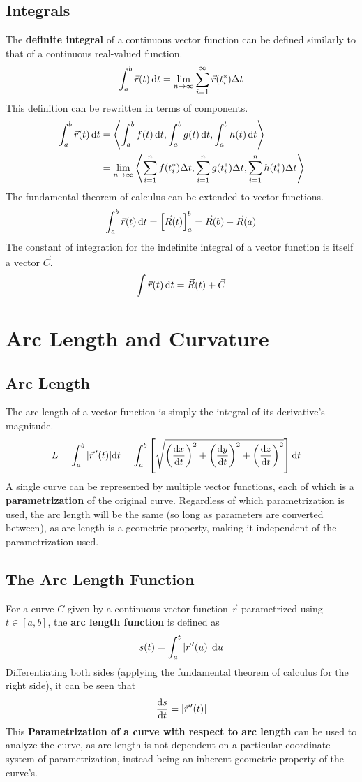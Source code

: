 \documentclass[../Calculus_\Roman{3}]{subfiles}
\begin{document}
			\subsection*{Integrals}
				The \textbf{definite integral} of a continuous vector function can be defined similarly to that of a continuous real-valued function.
					\[\int_a^b\vec{r}(t)\,\mathrm{d} t = \lim_{n\to\infty}\sum_{i = 1}^\infty \vec{r}(t_i^*)\Delta t\]
				This definition can be rewritten in terms of components.
					\begin{align*}
						\int_a^b\vec{r}(t)\,\mathrm{d} t &= \left\langle \int_a^b f(t)\,\mathrm{d} t, \int_a^b g(t)\,\mathrm{d} t, \int_a^b h(t)\,\mathrm{d} t \right\rangle \\ 
							&= \lim_{n\to\infty}\left\langle \sum_{i = 1}^n f(t_i^*)\Delta t, \sum_{i = 1}^n g(t_i^*)\Delta t, \sum_{i = 1}^n h(t_i^*)\Delta t \right\rangle
					\end{align*}
				The fundamental theorem of calculus can be extended to vector functions.
					\[\int_a^b \vec{r}(t)\,\mathrm{d} t = \left[\vec{R}(t)\right]_a^b = \vec{R}(b) - \vec{R}(a)\]
				The constant of integration for the indefinite integral of a vector function is itself a vector $\vec{C}$.
					\[\int \vec{r}(t)\,\mathrm{d} t = \vec{R}(t) + \vec{C}\]
		\section{Arc Length and Curvature}
			\subsection*{Arc Length}
				The arc length of a vector function is simply the integral of its derivative's magnitude.
					\begin{align*}
						L &= \int_a^b|\vec{r}\hspace{0.5mm}'(t)|\mathrm{d} t
								= \int_a^b\left[\sqrt{\left(\frac{\mathrm{d} x}{\mathrm{d} t}\right)^2 + \left(\frac{\mathrm{d} y}{\mathrm{d} t}\right)^2 + \left(\frac{\mathrm{d} z}{\mathrm{d} t}\right)^2}\right]\mathrm{d} t
					\end{align*}
				A single curve can be represented by multiple vector functions, each of which is a \textbf{parametrization} of the original curve. Regardless of which parametrization is used, the arc length will be the same (so long as parameters are converted between), as arc length is a geometric property, making it independent of the parametrization used.
			\subsection*{The Arc Length Function}
				For a curve $C$ given by a continuous vector function $\vec{r}$ parametrized using $t \in [a, b]$, the \textbf{arc length function} is defined as
					\[s(t) = \int_a^t|\vec{r}\hspace{0.5mm}'(u)|\,\mathrm{d} u\]
				Differentiating both sides (applying the fundamental theorem of calculus for the right side), it can be seen that
					\[\frac{\mathrm{d} s}{\mathrm{d} t} = |\vec{r}\hspace{0.5mm}'(t)|\]
				This \textbf{Parametrization of a curve with respect to arc length} can be used to analyze the curve, as arc length is not dependent on a particular coordinate system of parametrization, instead being an inherent geometric property of the curve's.
\end{document}
